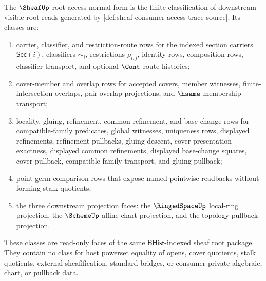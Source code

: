 \begin{definition}
\label{def:sheaf-root-access-normal-form}
The $\SheafUp$ root access normal form is the finite classification of downstream-visible root reads generated by \autoref{def:sheaf-consumer-access-trace-source}. Its classes are:
\begin{enumerate}
\item carrier, classifier, and restriction-route rows for the indexed section carriers $\mathsf{Sec}(i)$, classifiers $\sim_i$, restrictions $\rho_{i,j}$, identity rows, composition rows, classifier transport, and optional $\Cont$ route histories;
\item cover-member and overlap rows for accepted covers, member witnesses, finite-intersection overlaps, pair-overlap projections, and $\hsame$ membership transport;
\item locality, gluing, refinement, common-refinement, and base-change rows for compatible-family predicates, global witnesses, uniqueness rows, displayed refinements, refinement pullbacks, gluing descent, cover-presentation exactness, displayed common refinements, displayed base-change squares, cover pullback, compatible-family transport, and gluing pullback;
\item point-germ comparison rows that expose named pointwise readbacks without forming stalk quotients;
\item the three downstream projection faces: the $\RingedSpaceUp$ local-ring projection, the $\SchemeUp$ affine-chart projection, and the topology pullback projection.
\end{enumerate}
These classes are read-only faces of the same $\mathsf{BHist}$-indexed sheaf root package. They contain no class for host powerset equality of opens, cover quotients, stalk quotients, external sheafification, standard bridges, or consumer-private algebraic, chart, or pullback data.
\end{definition}

